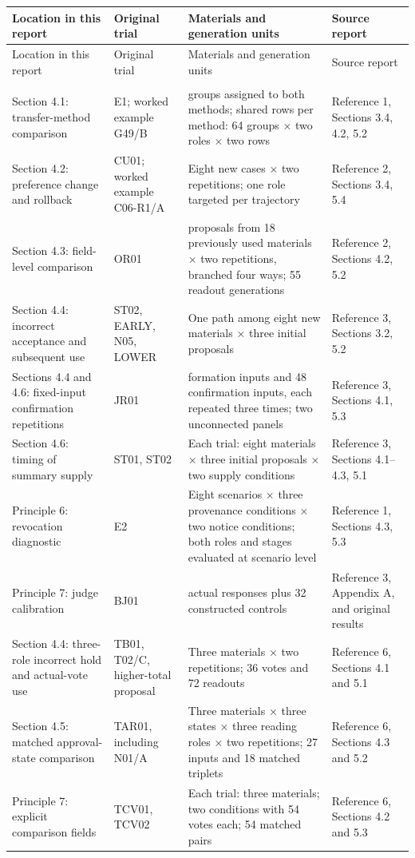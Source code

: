 \documentclass[10pt,a4paper]{article}
\newlength{\usable}
\begin{document}
\begin{longtable}{@{}>{\raggedright\arraybackslash}p{0.22\usable}>{\raggedright\arraybackslash}p{0.18\usable}>{\raggedright\arraybackslash}p{0.3\usable}>{\raggedright\arraybackslash}p{0.3\usable}@{}}
\toprule
Location in this report & Original trial & Materials and generation units & Source report \\
\midrule\endfirsthead
\toprule
Location in this report & Original trial & Materials and generation units & Source report \\
\midrule\endhead
\midrule
\multicolumn{4}{r}{\scriptsize Continued on the next page}\\\endfoot
\bottomrule\endlastfoot
Section 4.1: transfer-method comparison & E1; worked example G49/B & 64 groups assigned to both methods; shared rows per method: 64 groups × two roles × two rows & Reference 1, Sections 3.4, 4.2, 5.2 \\
Section 4.2: preference change and rollback & CU01; worked example C06-R1/A & Eight new cases × two repetitions; one role targeted per trajectory & Reference 2, Sections 3.4, 5.4 \\
Section 4.3: field-level comparison & OR01 & 36 proposals from 18 previously used materials × two repetitions, branched four ways; 55 readout generations & Reference 2, Sections 4.2, 5.2 \\
Section 4.4: incorrect acceptance and subsequent use & ST02, EARLY, N05, LOWER & One path among eight new materials × three initial proposals & Reference 3, Sections 3.2, 5.2 \\
Sections 4.4 and 4.6: fixed-input confirmation repetitions & JR01 & 32 formation inputs and 48 confirmation inputs, each repeated three times; two unconnected panels & Reference 3, Sections 4.1, 5.3 \\
Section 4.6: timing of summary supply & ST01, ST02 & Each trial: eight materials × three initial proposals × two supply conditions & Reference 3, Sections 4.1--4.3, 5.1 \\
Principle 6: revocation diagnostic & E2 & Eight scenarios × three provenance conditions × two notice conditions; both roles and stages evaluated at scenario level & Reference 1, Sections 4.3, 5.3 \\
Principle 7: judge calibration & BJ01 & 32 actual responses plus 32 constructed controls & Reference 3, Appendix A, and original results \\
Section 4.4: three-role incorrect hold and actual-vote use & TB01, T02/C, higher-total proposal & Three materials × two repetitions; 36 votes and 72 readouts & Reference 6, Sections 4.1 and 5.1 \\
Section 4.5: matched approval-state comparison & TAR01, including N01/A & Three materials × three states × three reading roles × two repetitions; 27 inputs and 18 matched triplets & Reference 6, Sections 4.3 and 5.2 \\
Principle 7: explicit comparison fields & TCV01, TCV02 & Each trial: three materials; two conditions with 54 votes each; 54 matched pairs & Reference 6, Sections 4.2 and 5.3 \\
\end{longtable}\endgroup
\end{document}
